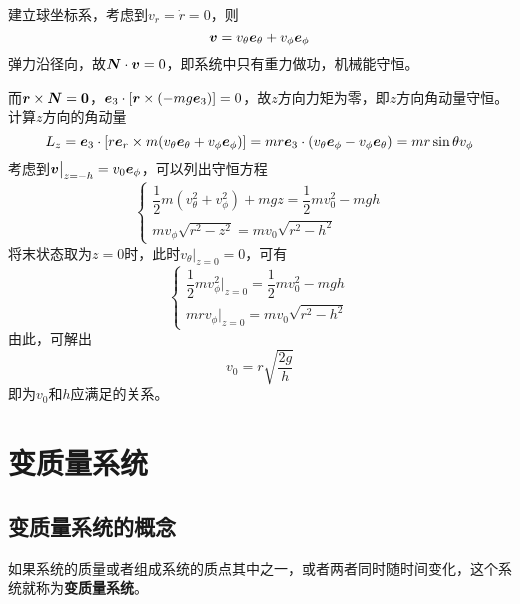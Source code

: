 \begin{solution}
建立球坐标系，考虑到$v_r = \dot{r} = 0$，则
\begin{equation*}
	\boldsymbol{v} = v_\theta \boldsymbol{e}_\theta + v_\phi \boldsymbol{e}_\phi
\end{equation*}
弹力沿径向，故$\boldsymbol{N} \cdot \boldsymbol{v} = 0$，即系统中只有重力做功，机械能守恒。

而$\boldsymbol{r} \times \boldsymbol{N} = \boldsymbol{0}$，$\boldsymbol{e}_3 \cdot \left[\boldsymbol{r} \times (-mg\boldsymbol{e}_3)\right] = 0$，故$z$方向力矩为零，即$z$方向角动量守恒。计算$z$方向的角动量
\begin{equation*}
	L_z = \boldsymbol{e}_3 \cdot \left[r\boldsymbol{e}_r \times m(v_\theta\boldsymbol{e}_\theta + v_\phi \boldsymbol{e}_\phi)\right] = mr\boldsymbol{e}_3 \cdot (v_\theta\boldsymbol{e}_\phi - v_\phi\boldsymbol{e}_\theta) = mr\sin \theta v_\phi
\end{equation*}
考虑到$\boldsymbol{v}\big|_{z=-h} = v_0 \boldsymbol{e}_\phi$，可以列出守恒方程
\begin{equation*}
	\begin{cases}
		\dfrac12 m(v_\theta^2 + v_\phi^2) + mgz = \dfrac12 mv_0^2 - mgh \\[1.5ex]
		mv_\phi \sqrt{r^2-z^2} = mv_0\sqrt{r^2-h^2}
	\end{cases}
\end{equation*}
将末状态取为$z=0$时，此时$v_\theta\big|_{z=0} = 0$，可有
\begin{equation*}
	\begin{cases}
		\dfrac12 mv_\phi^2\big|_{z=0} = \dfrac12 mv_0^2 - mgh \\
		mrv_\phi\big|_{z=0} = mv_0 \sqrt{r^2-h^2}
	\end{cases}
\end{equation*}
由此，可解出
\begin{equation*}
	v_0 = r\sqrt{\frac{2g}{h}}
\end{equation*}
即为$v_0$和$h$应满足的关系。
\end{solution}

\section{变质量系统}

\subsection{变质量系统的概念}

如果系统的质量或者组成系统的质点其中之一，或者两者同时随时间变化，这个系统就称为{\bf 变质量系统}。

